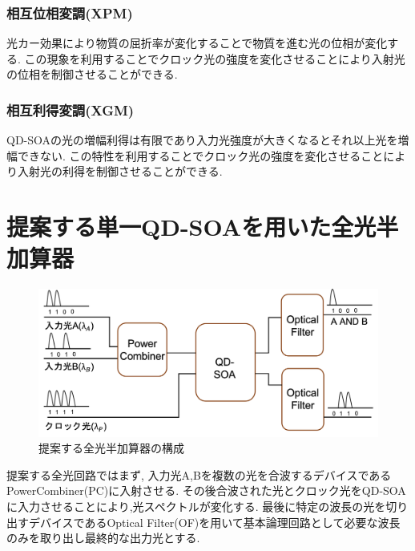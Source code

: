 \documentclass[dvipdfmx]{ujarticle}
\begin{document}
    \subsubsection{相互位相変調(XPM)}
    光カー効果により物質の屈折率が変化することで物質を進む光の位相が変化する.
    この現象を利用することでクロック光の強度を変化させることにより入射光の位相を制御させることができる.
    \subsubsection{相互利得変調(XGM)}
    QD-SOAの光の増幅利得は有限であり入力光強度が大きくなるとそれ以上光を増幅できない.
      この特性を利用することでクロック光の強度を変化させることにより入射光の利得を制御させることができる.

\section{提案する単一QD-SOAを用いた全光半加算器}
  \begin{figure}[H]
    \begin{center}
      \includegraphics[width=15cm]{images/kairo.png}
      \caption{提案する全光半加算器の構成}
    \end{center}
  \end{figure}
  提案する全光回路ではまず, 入力光A,Bを複数の光を合波するデバイスであるPowerCombiner(PC)に入射させる.
  その後合波された光とクロック光をQD-SOAに入力させることにより,光スペクトルが変化する.
  最後に特定の波長の光を切り出すデバイスであるOptical Filter(OF)を用いて基本論理回路として必要な波長のみを取り出し最終的な出力光とする.
\end{document}
